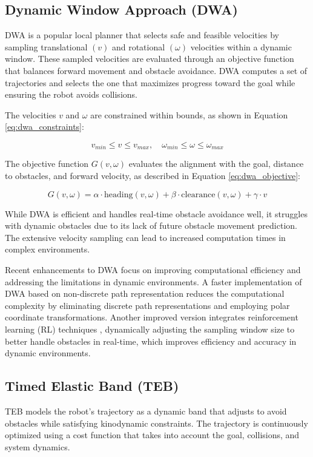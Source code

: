 \documentclass[conference]{IEEEtran}
\begin{document}
\subsection{Dynamic Window Approach (DWA)}
DWA is a popular local planner that selects safe and feasible velocities by sampling translational \((v)\) and rotational \((\omega)\) velocities within a dynamic window. These sampled velocities are evaluated through an objective function that balances forward movement and obstacle avoidance. DWA computes a set of trajectories and selects the one that maximizes progress toward the goal while ensuring the robot avoids collisions.

The velocities \(v\) and \(\omega\) are constrained within bounds, as shown in Equation \eqref{eq:dwa_constraints}:

\begin{equation}
\label{eq:dwa_constraints}
v_{min} \leq v \leq v_{max}, \quad \omega_{min} \leq \omega \leq \omega_{max}
\end{equation}

The objective function \(G(v, \omega)\) evaluates the alignment with the goal, distance to obstacles, and forward velocity, as described in Equation \eqref{eq:dwa_objective}:

\begin{equation}
\label{eq:dwa_objective}
G(v, \omega) = \alpha \cdot \text{heading}(v, \omega) + \beta \cdot \text{clearance}(v, \omega) + \gamma \cdot v
\end{equation}

While DWA is efficient and handles real-time obstacle avoidance well, it struggles with dynamic obstacles due to its lack of future obstacle movement prediction. The extensive velocity sampling can lead to increased computation times in complex environments.

Recent enhancements to DWA focus on improving computational efficiency and addressing the limitations in dynamic environments. A faster implementation of DWA based on non-discrete path representation \cite{lin2023faster} reduces the computational complexity by eliminating discrete path representations and employing polar coordinate transformations. Another improved version integrates reinforcement learning (RL) techniques \cite{zhou2022improved}, dynamically adjusting the sampling window size to better handle obstacles in real-time, which improves efficiency and accuracy in dynamic environments.

\subsection{Timed Elastic Band (TEB)}
TEB models the robot’s trajectory as a dynamic band that adjusts to avoid obstacles while satisfying kinodynamic constraints. The trajectory is continuously optimized using a cost function that takes into account the goal, collisions, and system dynamics.
\end{document}
